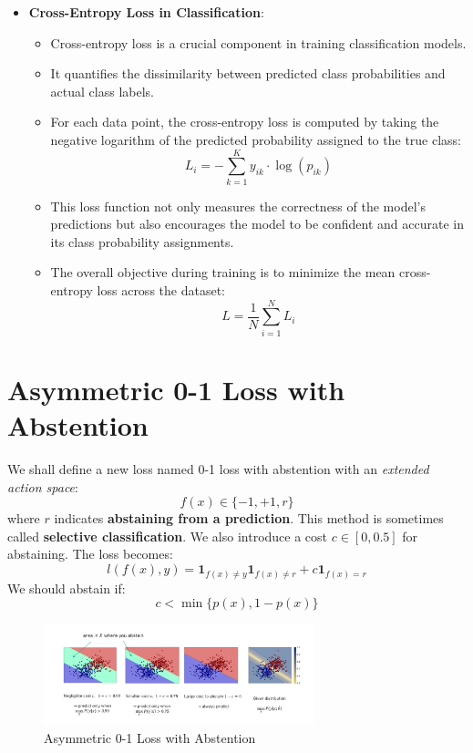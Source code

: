 \documentclass{article}
\begin{document}
\begin{itemize}
\begin{itemize}
    \end{itemize}
    \item \textbf{Cross-Entropy Loss in Classification}:
    \begin{itemize}
        \item Cross-entropy loss is a crucial component in training classification models.
        \item It quantifies the dissimilarity between predicted class probabilities and actual class labels.
        \item For each data point, the cross-entropy loss is computed by taking the negative logarithm of the predicted probability assigned to the true class:
        \[
        L_i = -\sum_{k=1}^{K} y_{ik} \cdot \log(p_{ik})
        \]
        \item This loss function not only measures the correctness of the model's predictions but also encourages the model to be confident and accurate in its class probability assignments.
        \item The overall objective during training is to minimize the mean cross-entropy loss across the dataset:
        \[
        L = \frac{1}{N} \sum_{i=1}^{N} L_i
        \]
    \end{itemize}
\end{itemize}

\section{Asymmetric 0-1 Loss with Abstention}
We shall define a new loss named 0-1 loss with abstention with an \textit{extended action space}:
\[
f(x) \in \{-1, +1, r\}
\]
where $r$ indicates \textbf{abstaining from a prediction}. This method is sometimes called \textbf{selective classification}. We also introduce a cost $c \in[0, 0.5]$ for abstaining. The loss becomes:
\[
l(f(x), y) = \mathbf{1}_{f(x)\neq y} \mathbf{1}_{f(x) \neq r} + c \mathbf{1}_{f(x) = r}
\]
We should abstain if:
\[
c < \min \{p(x), 1 - p(x)\}
\]
\begin{figure}[h]
    \centering
    \includegraphics[width=0.7\textwidth]{assets/0-1-loss.png}
    \caption{Asymmetric 0-1 Loss with Abstention}
\end{figure}
\end{document}
